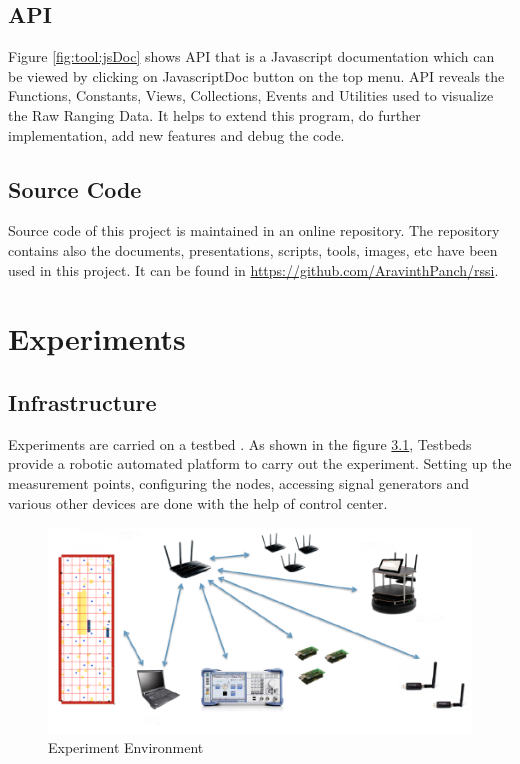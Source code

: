 \documentclass[11pt,a4paper,headinclude,footinclude,chapterprefix=on]{scrreprt}
\begin{document}
\section{API} Figure \ref{fig:tool:jsDoc} shows API that is a Javascript documentation which can be viewed by clicking on JavascriptDoc button on the top menu. API reveals the Functions, Constants, Views, Collections, Events and Utilities used to visualize the Raw Ranging Data. It helps to extend this program, do further implementation, add new features and debug the code. 

\section{Source Code}
Source code of this project is maintained in an online repository.  The repository contains also the documents, presentations, scripts, tools, images, etc have been used in this project. It can be found in \url{https://github.com/AravinthPanch/rssi}.




\chapter{Experiments} 
\section{Infrastructure} Experiments are carried on a testbed \cite{ref:crew}. As shown in the figure \ref{fig:experiment}, Testbeds provide a robotic automated platform to carry out the experiment. Setting up the measurement points, configuring the nodes, accessing signal generators and various other devices are done with the help of control center. 
\begin{figure}
	[!h] \centering 
	\includegraphics[width=13cm]{Images/evari.png} \caption{Experiment Environment} \label{fig:experiment} 
\end{figure}
\end{document}
